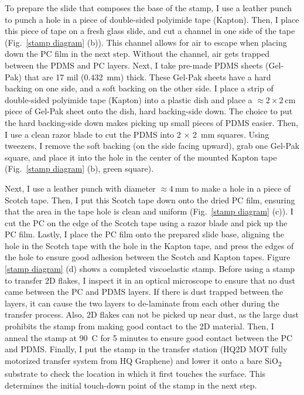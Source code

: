 \documentclass[double,12pt,1in,seploa]{beavtex}
\begin{document}
To prepare the slide that composes the base of the stamp, I use a leather punch to punch a hole in a piece of double-sided polyimide tape (Kapton). Then, I place this piece of tape on a fresh glass slide, and cut a channel in one side of the tape (Fig.\ \ref{stamp diagram} (b)). This channel allows for air to escape when placing down the PC film in the next step. Without the channel, air gets trapped between the PDMS and PC layers. Next, I take pre-made PDMS sheets (Gel-Pak) that are 17 mil (\SI{0.432}{\milli\meter}) thick. These Gel-Pak sheets have a hard backing on one side, and a soft backing on the other side. I place a strip of double-sided polyimide tape (Kapton) into a plastic dish and place a $\approx 2 \times \SI{2}{\centi\meter}$ piece of Gel-Pak sheet onto the dish, hard backing-side down. The choice to put the hard backing-side down makes picking up small pieces of PDMS easier. Then, I use a clean razor blade to cut the PDMS into 2 $\times$ \SI{2}{mm} squares. Using tweezers, I remove the soft backing (on the side facing upward), grab one Gel-Pak square, and place it into the hole in the center of the mounted Kapton tape (Fig.\ \ref{stamp diagram} (b), green square).

Next, I use a leather punch with diameter $\approx  \SI{4}{\milli\meter}$ to make a hole in a piece of Scotch tape. Then, I put this Scotch tape down onto the dried PC film, ensuring that the area in the tape hole is clean and uniform (Fig.\ \ref{stamp diagram} (c)). I cut the PC on the edge of the Scotch tape using a razor blade and pick up the PC film. Lastly, I place the PC film onto the prepared slide base, aligning the hole in the Scotch tape with the hole in the Kapton tape, and press the edges of the hole to ensure good adhesion between the Scotch and Kapton tapes. Figure \ref{stamp diagram} (d) shows a completed viscoelastic stamp. Before using a stamp to transfer 2D flakes, I inspect it in an optical microscope to ensure that no dust came between the PC and PDMS layers. If there is dust trapped between the layers, it can cause the two layers to de-laminate from each other during the transfer process. Also, 2D flakes can not be picked up near dust, as the large dust prohibits the stamp from making good contact to the 2D material. Then, I anneal the stamp at \SI{90}{C} for 5 minutes to ensure good contact between the PC and PDMS. Finally, I put the stamp in the transfer station (HQ2D MOT fully motorized transfer system from HQ Graphene) and lower it onto a bare SiO\textsubscript{2} substrate to check the location in which it first touches the surface. This determines the initial touch-down point of the stamp in the next step.
\end{document}
